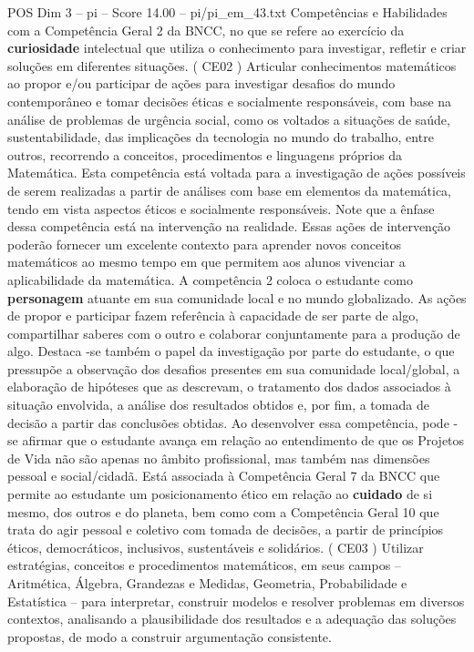 \begin{textsample}{POS Dim 3 – pi – Score 14.00 – pi/pi\_em\_43.txt}  \label{ex:f3_pos_258}
Competências e Habilidades com a Competência Geral 2 da BNCC, no que se refere ao exercício da \textbf{curiosidade} intelectual que utiliza o conhecimento para investigar, refletir e criar soluções em diferentes situações. ( CE02 ) Articular conhecimentos matemáticos ao propor e/ou participar de ações para investigar desafios do mundo contemporâneo e tomar decisões éticas e socialmente responsáveis, com base na análise de problemas de urgência social, como os voltados a situações de saúde, sustentabilidade, das implicações da tecnologia no mundo do trabalho, entre outros, recorrendo a conceitos, procedimentos e linguagens próprios da Matemática.
Esta competência está voltada para a investigação de ações possíveis de serem realizadas a partir de análises com base em elementos da matemática, tendo em vista aspectos éticos e socialmente responsáveis.
Note que a ênfase dessa competência está na intervenção na realidade.
Essas ações de intervenção poderão fornecer um excelente contexto para aprender novos conceitos matemáticos ao mesmo tempo em que permitem aos alunos vivenciar a aplicabilidade da matemática.
A competência 2 coloca o estudante como \textbf{personagem} atuante em sua comunidade local e no mundo globalizado.
As ações de propor e participar fazem referência à capacidade de ser parte de algo, compartilhar saberes com o outro e colaborar conjuntamente para a produção de algo.
Destaca -se também o papel da investigação por parte do estudante, o que pressupõe a observação dos desafios presentes em sua comunidade local/global, a elaboração de hipóteses que as descrevam, o tratamento dos dados associados à situação envolvida, a análise dos resultados obtidos e, por fim, a tomada de decisão a partir das conclusões obtidas.
Ao desenvolver essa competência, pode -se afirmar que o estudante avança em relação ao entendimento de que os Projetos de Vida não são apenas no âmbito profissional, mas também nas dimensões pessoal e social/cidadã.
Está associada à Competência Geral 7 da BNCC que permite ao estudante um posicionamento ético em relação ao \textbf{cuidado} de si mesmo, dos outros e do planeta, bem como com a Competência Geral 10 que trata do agir pessoal e coletivo com tomada de decisões, a partir de princípios éticos, democráticos, inclusivos, sustentáveis e solidários. ( CE03 ) Utilizar estratégias, conceitos e procedimentos matemáticos, em seus campos – Aritmética, Álgebra, Grandezas e Medidas, Geometria, Probabilidade e Estatística – para interpretar, construir modelos e resolver problemas em diversos contextos, analisando a plausibilidade dos resultados e a adequação das soluções propostas, de modo a construir argumentação consistente.

\end{textsample}
